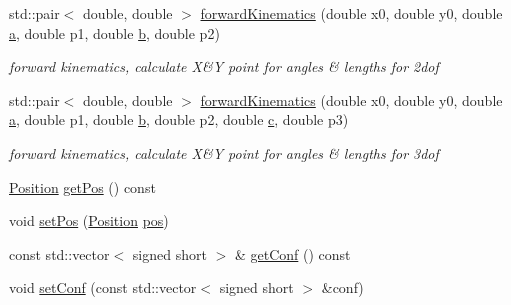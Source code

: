 \begin{DoxyCompactItemize}
std\+::pair$<$ double, double $>$ \hyperlink{class_robotic_arm_a549f24f349105a6b5130eb237d737132}{forward\+Kinematics} (double x0, double y0, double \hyperlink{class_robotic_arm_aaf0461b1cb35da93d2e446f50b9813a4}{a}, double p1, double \hyperlink{class_robotic_arm_a2758a63b85f492abda0e84f32fbfdd98}{b}, double p2)
\begin{DoxyCompactList}\small\item\em forward kinematics, calculate X\&Y point for angles \& lengths for 2dof \end{DoxyCompactList}\item 
std\+::pair$<$ double, double $>$ \hyperlink{class_robotic_arm_ade404a134912096fb363fa90ea0cd927}{forward\+Kinematics} (double x0, double y0, double \hyperlink{class_robotic_arm_aaf0461b1cb35da93d2e446f50b9813a4}{a}, double p1, double \hyperlink{class_robotic_arm_a2758a63b85f492abda0e84f32fbfdd98}{b}, double p2, double \hyperlink{class_robotic_arm_a5f6cae6b67db69c97b75970dacc72ea8}{c}, double p3)
\begin{DoxyCompactList}\small\item\em forward kinematics, calculate X\&Y point for angles \& lengths for 3dof \end{DoxyCompactList}\item 
\hyperlink{struct_position}{Position} \hyperlink{class_robotic_arm_a472bb97d5867b86add81326010da2f0f}{get\+Pos} () const 
\item 
void \hyperlink{class_robotic_arm_ad3f7fcafa4909fee1db198353434e987}{set\+Pos} (\hyperlink{struct_position}{Position} \hyperlink{class_robotic_arm_a8f6a5bea331874cfae234e6b97f6dec5}{pos})
\item 
const std\+::vector$<$ signed short $>$ \& \hyperlink{class_robotic_arm_a18d2147e468f8026f301f1d96d040ea5}{get\+Conf} () const 
\item 
void \hyperlink{class_robotic_arm_ad69cfd597e6e397b88a316ef93b68ece}{set\+Conf} (const std\+::vector$<$ signed short $>$ \&conf)
\end{DoxyCompactItemize}
